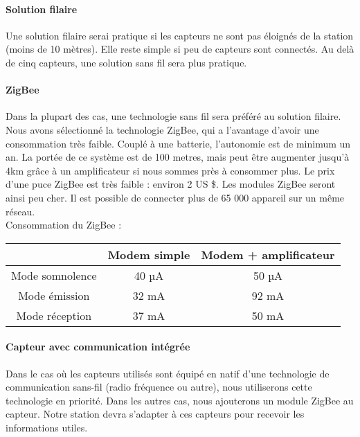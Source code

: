 \paragraph{Solution filaire}
Une solution filaire serai pratique si les capteurs ne sont pas éloignés de la station (moins de 10 mètres). Elle reste simple si peu de capteurs sont connectés.
Au delà de cinq capteurs, une solution sans fil sera plus pratique.\\

\paragraph{ZigBee}

Dans la plupart des cas, une technologie sans fil sera préféré au solution filaire. Nous avons sélectionné la technologie ZigBee, qui a l’avantage d’avoir une consommation très faible. Couplé à une batterie, l’autonomie est de minimum un an. 
La portée de ce système est de 100 metres, mais peut être augmenter jusqu’à 4km grâce à un amplificateur si nous sommes près à consommer plus. Le prix d’une puce ZigBee est très faible : environ 2 US \$. Les modules ZigBee seront ainsi peu cher.
Il est possible de connecter plus de 65 000 appareil sur un même réseau.\\

Consommation du ZigBee :

\begin{center}
\begin{tabular}{|c|c|c|}
\hline  & Modem simple & Modem + amplificateur \\ 
\hline Mode somnolence & 40 µA & 50 µA \\ 
\hline Mode émission & 32 mA  & 92 mA \\ 
\hline Mode réception & 37 mA  & 50 mA \\ 
\hline 
\end{tabular} 
\end{center}

\paragraph{Capteur avec communication intégrée}

Dans le cas où les capteurs utilisés sont équipé en natif d’une technologie de communication sans-fil (radio fréquence ou autre), nous utiliserons cette technologie en priorité. Dans les autres cas, nous ajouterons un module ZigBee au capteur. Notre station devra s’adapter à ces capteurs pour recevoir les informations utiles.

